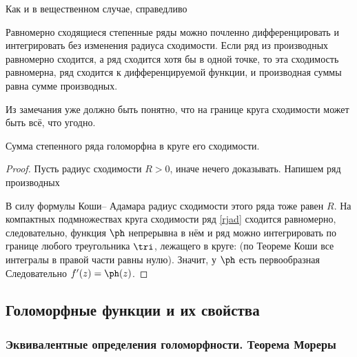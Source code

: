 \documentclass[a4paper]{article}
\begin{document}
Как и в вещественном случае, справедливо
\begin{stm}
Равномерно сходящиеся степенные ряды можно почленно дифференцировать и интегрировать
без изменения радиуса сходимости. Если ряд из производных равномерно сходится, а ряд сходится хотя бы в одной точке, то эта сходимость равномерна,
ряд сходится к дифференцируемой функции, и производная суммы равна сумме производных.
\end{stm}

Из замечания уже должно быть понятно, что на границе круга сходимости может быть всё, что угодно.


\begin{theorem}
Сумма степенного ряда
голоморфна в круге его сходимости.
\end{theorem}
\begin{proof}
Пусть радиус сходимости $R>0$, иначе нечего доказывать. Напишем ряд производных

В силу формулы Коши-- Адамара радиус сходимости этого ряда тоже равен $R$. На компактных подмножествах круга сходимости ряд \eqref{rjad} сходится равномерно, следовательно, функция $\ph$ непрерывна в нём и ряд можно интегрировать по границе любого треугольника $\tri$, лежащего в круге:
(по Теореме Коши все интегралы в правой части равны нулю). Значит, у $\ph$ есть первообразная
Следовательно $f'(z) = \ph(z)$. \end{proof}




\subsection{Голоморфные функции и их свойства}

\subsubsection{Эквивалентные определения голоморфности. Теорема Мореры}
\end{document}
